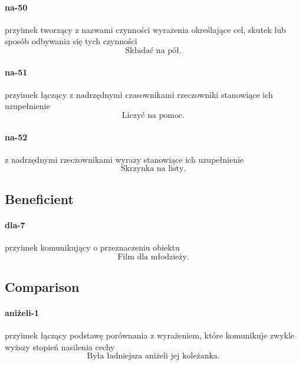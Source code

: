 \documentclass[a4paper, 12pt]{article}
\theoremstyle{remark}
\begin{document}
\paragraph{na-50}\label{prep-50}	przyimek tworzący z nazwami czynności wyrażenia określające cel, skutek lub sposób odbywania się tych czynności
\begin{equation}
\text{Składać na pół.}
\end{equation}
\paragraph{na-51}\label{prep-51}	przyimek łączący z nadrzędnymi czasownikami rzeczowniki stanowiące ich uzupełnienie
\begin{equation}
\text{Liczyć na pomoc.}
\end{equation}
\paragraph{na-52}\label{prep-52}	z nadrzędnymi rzeczownikami wyrazy stanowiące ich uzupełnienie
\begin{equation}
\text{Skrzynka na listy.}
\end{equation}
\subsection{Beneficient} %
\label{sub:beneficient}
\paragraph{dla-7} \label{prep-7}	przyimek komunikujący o przeznaczeniu obiektu
\begin{equation}
\text{Film dla młodzieży.}
\end{equation}
\subsection{Comparison} %
\label{sub:comparison}
\paragraph{aniżeli-1} \label{prep-1}	przyimek łączący podstawę porównania z wyrażeniem, które komunikuje zwykle wyższy stopień nasilenia cechy
\begin{equation}
\text{Była ładniejsza aniżeli jej koleżanka.}
\end{equation}
\end{document}
